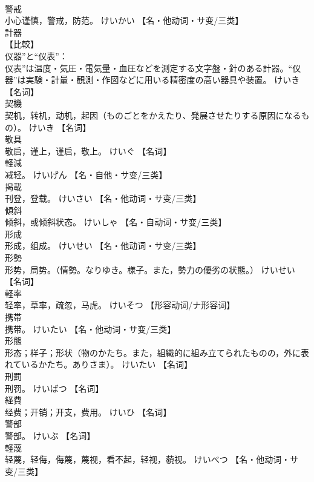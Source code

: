 \documentclass[8pt]{extreport}
\begin{document}
\begin{CJK}{UTF8}{min}
\\	警戒	
\\	小心谨慎，警戒，防范。	けいかい		【名・他动词・サ变/三类】
\\	計器	
\\	【比較】 
\\	仪器”と“仪表”： 
\\	仪表”は温度・気圧・電気量・血圧などを測定する文字盤・針のある計器。“仪器”は実験・計量・観測・作図などに用いる精密度の高い器具や装置。	けいき		【名词】
\\	契機	
\\	契机，转机，动机，起因（ものごとをかえたり、発展させたりする原因になるもの）。	けいき		【名词】
\\	敬具	
\\	敬启，谨上，谨启，敬上。	けいぐ		【名词】
\\	軽減	
\\	减轻。	けいげん		【名・自他・サ变/三类】
\\	掲載	
\\	刊登，登载。	けいさい		【名・他动词・サ变/三类】
\\	傾斜	
\\	倾斜，或倾斜状态。	けいしゃ		【名・自动词・サ变/三类】
\\	形成	
\\	形成，组成。	けいせい		【名・他动词・サ变/三类】
\\	形勢	
\\	形势，局势。（情勢。なりゆき。様子。また，勢力の優劣の状態。）	けいせい		【名词】
\\	軽率	
\\	轻率，草率，疏忽，马虎。	けいそつ		【形容动词/ナ形容词】
\\	携帯	
\\	携带。	けいたい		【名・他动词・サ变/三类】
\\	形態	
\\	形态；样子；形状（物のかたち。また，組織的に組み立てられたものの，外に表れているかたち。ありさま）。	けいたい		【名词】
\\	刑罰	
\\	刑罚。	けいばつ		【名词】
\\	経費	
\\	经费；开销；开支，费用。	けいひ		【名词】
\\	警部	
\\	警部。	けいぶ		【名词】
\\	軽蔑	
\\	轻蔑，轻侮，侮蔑，蔑视，看不起，轻视，藐视。	けいべつ		【名・他动词・サ变/三类】

\end{CJK}
\end{document}
